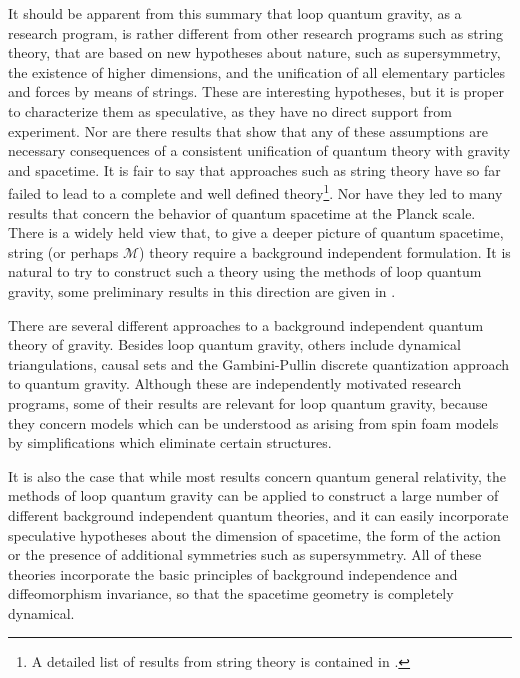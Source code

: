 \documentclass[12pt]{article}
\begin{document}
   
 It should be apparent from this summary that loop quantum gravity, 
 as a research program, is
  rather different from other research programs such as string 
  theory, that are based on new hypotheses about nature, such as 
  supersymmetry, the existence of higher dimensions, and the 
  unification of all elementary particles and forces by means of 
  strings.  These are interesting 
  hypotheses, but it is proper to characterize them as speculative, 
  as they have no direct support from experiment. Nor are there results that 
  show that any of these assumptions are necessary consequences of a 
  consistent unification of quantum theory with gravity and spacetime.
  It is fair to say that approaches 
  such as string theory have so far failed to lead to a complete 
  and well defined theory\footnote{A detailed list of results from string theory is contained in
\cite{howfar}.}. Nor have they led to many results that concern 
  the behavior of quantum spacetime at the Planck scale. There is a widely 
  held view that, to give a deeper picture of quantum spacetime, 
  string (or perhaps $\mathcal M$) theory require a background 
  independent formulation.  It is natural to try to construct such a theory using the
methods of loop quantum gravity, some preliminary results in this direction are
given in \cite{11d,Mlee}.
  
  There are several different approaches to a background independent 
  quantum theory of gravity. Besides loop quantum gravity, others include 
  dynamical triangulations\cite{dynamical,AL}, causal sets\cite{causalsets}
and the Gambini-Pullin discrete quantization approach to quantum gravity\cite{GP-discrete}. 
Although these are independently motivated research programs, some of their results
are relevant for loop quantum gravity, because they concern models
which can be understood as arising from spin foam
models by 
simplifications which eliminate certain structures. 

It is also the case that while most results concern quantum general relativity, the
methods of loop quantum gravity  can be applied to construct a large 
  number of different background independent quantum theories, and it can easily incorporate 
  speculative hypotheses about the dimension of spacetime, the form 
  of the action   or the 
  presence of additional symmetries such as supersymmetry.  All of 
  these theories incorporate the basic principles 
of  background independence and diffeomorphism invariance, 
  so that the spacetime geometry is completely dynamical.  
  
\end{document}
